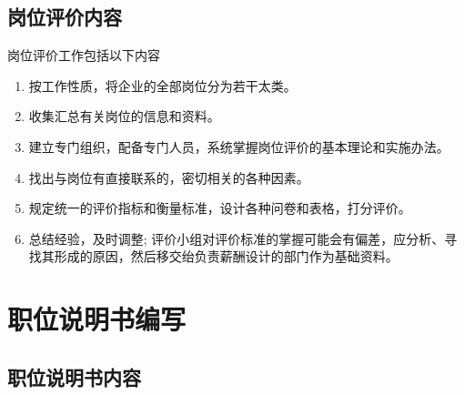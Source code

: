     \subsection {岗位评价内容}

    岗位评价工作包括以下内容

    \begin{enumerate}
        \item 按工作性质，将企业的全部岗位分为若干太类。

        \item 收集汇总有关岗位的信息和资料。

        \item 建立专门组织，配备专门人员，系统掌握岗位评价的基本理论和实施办法。

        \item 找出与岗位有直接联系的，密切相关的各种因素。

        \item 规定统一的评价指标和衡量标准，设计各种问卷和表格，打分评价。

        \item 总结经验，及时调整; 评价小组对评价标准的掌握可能会有偏差，应分析、寻找其形成的原因，然后移交绐负责薪酬设计的部门作为基础资料。
    \end{enumerate}

\section {职位说明书编写}

    \subsection {职位说明书内容}


